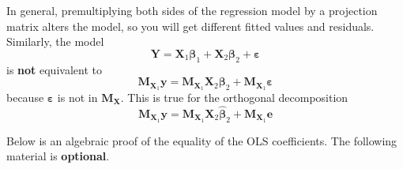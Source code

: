 \documentclass[]{book}
\theoremstyle{definition}
\theoremstyle{definition}
\theoremstyle{definition}
\theoremstyle{remark}
\let\BeginKnitrBlock\begin \let\EndKnitrBlock\end
\begin{document}
\BeginKnitrBlock{rmdcaution}
In general, premultiplying both sides of the regression model by a projection matrix alters the model, so you will get different fitted values and residuals. Similarly, the model
\[\boldsymbol{Y} = \mathbf{X}_1 \boldsymbol{\beta}_1 + \mathbf{X}_2\boldsymbol{\beta}_2 + \boldsymbol{\varepsilon}\]
is \textbf{not} equivalent to
\[
\mathbf{M}_{\mathbf{X}_1}\boldsymbol{y} = \mathbf{M}_{\mathbf{X}_1}\mathbf{X}_2 \boldsymbol{\beta}_2 + \mathbf{M}_{\mathbf{X}_1}\boldsymbol{\varepsilon}
\]
because \(\boldsymbol{\varepsilon}\) is not in \(\mathbf{M}_\mathbf{X}\). This is true for the orthogonal decomposition
\[
\mathbf{M}_{\mathbf{X}_1}\boldsymbol{y} = \mathbf{M}_{\mathbf{X}_1}\mathbf{X}_2 \hat{\boldsymbol{\beta}}_2 + \mathbf{M}_{\mathbf{X}_1}\boldsymbol{e}
\]
\EndKnitrBlock{rmdcaution}

Below is an algebraic proof of the equality of the OLS coefficients. The following material is \textbf{optional}.
\end{document}
